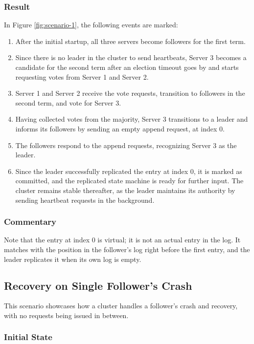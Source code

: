 \subsubsection{Result}

In Figure \ref{fig:scenario-1}, the following events are marked:
\begin{enumerate}
    \item After the initial startup, all three servers become followers for the first term.
    \item Since there is no leader in the cluster to send heartbeats, Server 3 becomes a candidate for the second term after an election timeout goes by and starts requesting votes from Server 1 and Server 2.
    \item Server 1 and Server 2 receive the vote requests, transition to followers in the second term, and vote for Server 3.
    \item Having collected votes from the majority, Server 3 transitions to a leader and informs its followers by sending an empty append request, at index 0.
    \item The followers respond to the append requests, recognizing Server 3 as the leader.
    \item Since the leader successfully replicated the entry at index 0, it is marked as committed, and the replicated state machine is ready for further input. The cluster remains stable thereafter, as the leader maintains its authority by sending heartbeat requests in the background.
\end{enumerate}

\subsubsection{Commentary}

Note that the entry at index 0 is virtual; it is not an actual entry in the log. It matches with the position in the follower's log right before the first entry, and the leader replicates it when its own log is empty.

\subsection{Recovery on Single Follower's Crash}

This scenario showcases how a cluster handles a follower's crash and recovery, with no requests being issued in between.

\subsubsection{Initial State}

